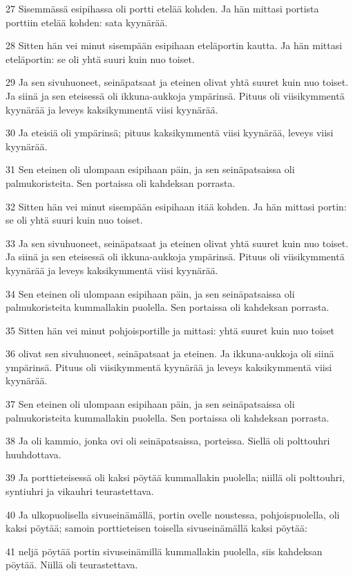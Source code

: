 \par 27 Sisemmässä esipihassa oli portti etelää kohden. Ja hän mittasi portista porttiin etelää kohden: sata kyynärää.
\par 28 Sitten hän vei minut sisempään esipihaan eteläportin kautta. Ja hän mittasi eteläportin: se oli yhtä suuri kuin nuo toiset.
\par 29 Ja sen sivuhuoneet, seinäpatsaat ja eteinen olivat yhtä suuret kuin nuo toiset. Ja siinä ja sen eteisessä oli ikkuna-aukkoja ympärinsä. Pituus oli viisikymmentä kyynärää ja leveys kaksikymmentä viisi kyynärää.
\par 30 Ja eteisiä oli ympärinsä; pituus kaksikymmentä viisi kyynärää, leveys viisi kyynärää.
\par 31 Sen eteinen oli ulompaan esipihaan päin, ja sen seinäpatsaissa oli palmukoristeita. Sen portaissa oli kahdeksan porrasta.
\par 32 Sitten hän vei minut sisempään esipihaan itää kohden. Ja hän mittasi portin: se oli yhtä suuri kuin nuo toiset.
\par 33 Ja sen sivuhuoneet, seinäpatsaat ja eteinen olivat yhtä suuret kuin nuo toiset. Ja siinä ja sen eteisessä oli ikkuna-aukkoja ympärinsä. Pituus oli viisikymmentä kyynärää ja leveys kaksikymmentä viisi kyynärää.
\par 34 Sen eteinen oli ulompaan esipihaan päin, ja sen seinäpatsaissa oli palmukoristeita kummallakin puolella. Sen portaissa oli kahdeksan porrasta.
\par 35 Sitten hän vei minut pohjoisportille ja mittasi: yhtä suuret kuin nuo toiset
\par 36 olivat sen sivuhuoneet, seinäpatsaat ja eteinen. Ja ikkuna-aukkoja oli siinä ympärinsä. Pituus oli viisikymmentä kyynärää ja leveys kaksikymmentä viisi kyynärää.
\par 37 Sen eteinen oli ulompaan esipihaan päin, ja sen seinäpatsaissa oli palmukoristeita kummallakin puolella. Sen portaissa oli kahdeksan porrasta.
\par 38 Ja oli kammio, jonka ovi oli seinäpatsaissa, porteissa. Siellä oli polttouhri huuhdottava.
\par 39 Ja porttieteisessä oli kaksi pöytää kummallakin puolella; niillä oli polttouhri, syntiuhri ja vikauhri teurastettava.
\par 40 Ja ulkopuolisella sivuseinämällä, portin ovelle noustessa, pohjoispuolella, oli kaksi pöytää; samoin porttieteisen toisella sivuseinämällä kaksi pöytää:
\par 41 neljä pöytää portin sivuseinämillä kummallakin puolella, siis kahdeksan pöytää. Niillä oli teurastettava.

